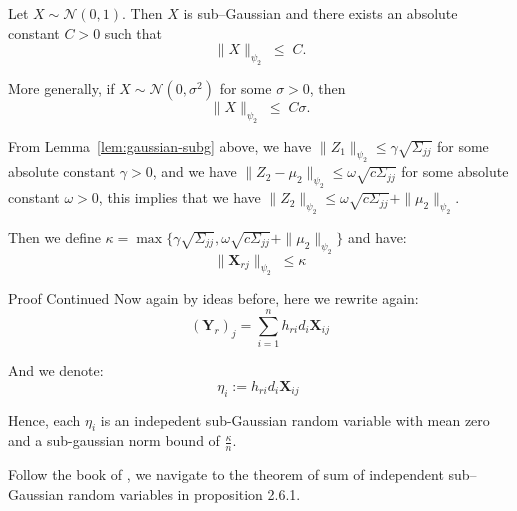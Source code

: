 \documentclass{beamer}
\theoremstyle{remark}
\begin{document}
\begin{frame}
\begin{lemma}\label{lem:gaussian-subg}
    \leavevmode
                Let \(X\sim\mathcal N(0,1)\).  
                Then \(X\) is sub--Gaussian and there exists an absolute constant \(C>0\) such that  
                \[
                    \|X\|_{\psi_{2}}\;\le\;C.
                \]
    
                More generally, if \(X\sim\mathcal N(0,\sigma^{2})\) for some \(\sigma>0\), then  
                \[
                    \|X\|_{\psi_{2}}\;\le\;C\sigma.
                \]
    \end{lemma}
\vspace{0.39cm}
From Lemma~\ref{lem:gaussian-subg} above, we have $\|Z_1\|_{\psi_{2}}\leq\gamma\sqrt{\Sigma_{jj}}$ 
for some absolute constant $\gamma > 0$, and we have $\|Z_2-\mu_2\|_{\psi_{2}}\leq\omega\sqrt{c\Sigma_{jj}}$
for some absolute constant $\omega > 0$, this implies that we have $\|Z_2\|_{\psi_{2}}\leq\omega\sqrt{c\Sigma_{jj}}+\|\mu_2\|_{\psi_{2}}$.

Then we define $\kappa = \max\bigl\{\gamma\sqrt{\Sigma_{jj}},\omega\sqrt{c\Sigma_{jj}}+\|\mu_2\|_{\psi_{2}}\bigr\}$ and have:
\[
\|\mathbf{X}_{rj}\|_{\psi_{2}}\;\le\kappa
\]
\end{frame}
\begin{frame}{Proof Continued}
Now again by ideas before, here we rewrite again:
\[(\mathbf{Y}_{r})_{j} = \sum_{i=1}^{n} h_{ri} d_{i} \mathbf{X}_{ij}\]

And we denote:
\[
    \eta_{i} := h_{ri} d_{i} \mathbf{X}_{ij}\
\]

Hence, each \(\eta_{i}\) is an indepedent sub-Gaussian random variable with mean zero and a sub-gaussian norm bound of \(\frac{\kappa}{n}\).

Follow the book of \cite{vershynin2018high}, we navigate to the theorem of sum of independent sub–Gaussian random variables in proposition 2.6.1.
\end{frame}
\end{document}
